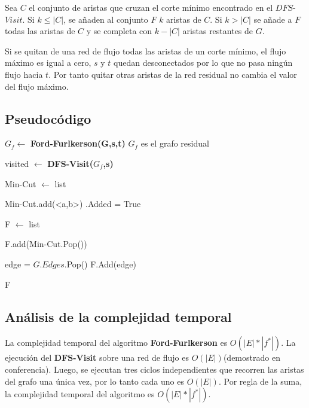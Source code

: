 \documentclass[a4paper,10pt]{article}
\begin{document}
	Sea $C$ el conjunto de aristas que cruzan el corte m\'inimo encontrado en el $DFS$-$Visit$. Si $k \leq |C|$, se a\~naden al conjunto $F$ $k$ aristas de $C$. Si $k > |C| $ se a\~nade a $F$ todas las aristas de $C$ y se completa con $k - |C|$ aristas restantes de $G$.
	
	Si se quitan de una red de flujo todas las aristas de un corte m\'inimo, el flujo m\'aximo es igual a cero, $s$ y $t$ quedan desconectados por lo que no pasa ning\'un flujo hacia $t$. Por tanto quitar otras aristas de la red residual no cambia el valor del flujo m\'aximo.
	
	\subsection{Pseudoc\'odigo}  
	\begin{algorithm}[H] 
		\caption{ }            
		\begin{algorithmic}[1]
			\label{ConjuntoF}
			\State $G_f \gets$ {\bf Ford-Furlkerson(G,s,t)}  \Comment $G_f$ es el grafo residual  
			
			\State visited $\gets$ {\bf DFS-Visit($G_f$,s)}
			
			\State Min-Cut $\gets$ list     
			
			\State Min-Cut.add(<a,b>)  
			\State <a,b>.Added = True
			\EndIf
			\EndFor
			
			\State F $\gets$ list    
			
			\State F.add(Min-Cut.Pop())    
			\EndWhile
			
			\State edge = $G.Edges$.Pop()
			\State F.Add(edge)
			\EndIf
			\EndWhile
			
			 F       
		\end{algorithmic}
	\end{algorithm} 
	\subsection{Análisis de la complejidad temporal} 
	La complejidad temporal del algoritmo {\bf Ford-Furlkerson} es $O(|E|*|f^*|)$. La ejecuci\'on del {\bf DFS-Visit} sobre una red de flujo es $O(|E|)$(demostrado en conferencia). Luego, se ejecutan tres ciclos independientes que recorren las aristas del grafo una \'unica vez, por lo tanto cada uno es $O(|E|)$. Por regla de la suma, la complejidad temporal del algoritmo es $O(|E|*|f^*|)$.
\end{document}
